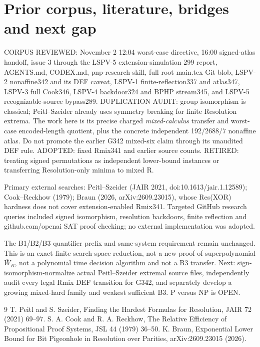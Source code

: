 \documentclass{article}
\begin{document}
\section*{Prior corpus, literature, bridges and next gap}
CORPUS REVIEWED: November 2 12:04 worst-case directive, 16:00 signed-atlas handoff, issue 3 through the LSPV-5 extension-simulation 299 report, AGENTS.md, CODEX.md, pnp-research skill, full root main.tex Git blob, LSPV-2 nonaffine342 and its DEF caveat, LSPV-1 finite-reflection337 and atlas347, LSPV-3 full Cook346, LSPV-4 backdoor324 and BPHP stream345, and LSPV-5 recognizable-source bypass289. DUPLICATION AUDIT: group isomorphism is classical; Peitl--Szeider already uses symmetry breaking for finite Resolution extrema. The work here is its precise charged \emph{mixed-calculus} transfer and worst-case encoded-length quotient, plus the concrete independent 192/2688/7 nonaffine atlas. Do not promote the earlier G342 mixed-six claim through its unaudited DEF rule. ADOPTED: fixed Rmix341 and earlier source counts. RETIRED: treating signed permutations as independent lower-bound instances or transferring Resolution-only minima to mixed R.

Primary external searches: Peitl--Szeider (JAIR 2021, doi:10.1613/jair.1.12589); Cook--Reckhow (1979); Braun (2026, arXiv:2609.23015), whose Res(XOR) hardness does not cover extension-enabled Rmix341. Targeted GitHub research queries included signed isomorphism, resolution backdoors, finite reflection and github.com/openai SAT proof checking; no external implementation was adopted.

The B1/B2/B3 quantifier prefix and same-system requirement remain unchanged. This is an exact finite search-space reduction, not a new proof of superpolynomial $\overline W_R$, not a polynomial time decision algorithm and not a B3 transfer. Next: sign-isomorphism-normalize actual Peitl--Szeider extremal source files, independently audit every legal Rmix DEF transition for G342, and separately develop a growing mixed-hard family and weakest sufficient B3. P versus NP is OPEN.

\begin{thebibliography}{9}
 T. Peitl and S. Szeider, Finding the Hardest Formulas for Resolution, JAIR 72 (2021) 69--97.
 S. A. Cook and R. A. Reckhow, The Relative Efficiency of Propositional Proof Systems, JSL 44 (1979) 36--50.
 K. Braun, Exponential Lower Bound for Bit Pigeonhole in Resolution over Parities, arXiv:2609.23015 (2026).
\end{thebibliography}
\end{document}
